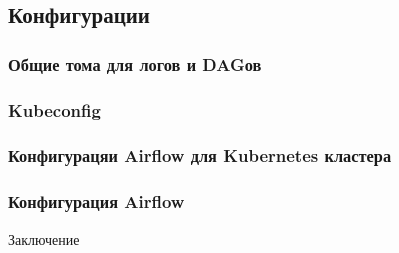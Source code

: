 \documentclass[bachelor, och, pract]{SCWorks}
\begin{document}
\subsection{Конфигурации}
\subsubsection{Общие тома для логов и DAGов}
\subsubsection{Kubeconfig}
\subsubsection{Конфигурацяи Airflow для Kubernetes кластера}
\subsubsection{Конфигурация Airflow}

\conclusion
Заключение



\appendix
\end{document}
